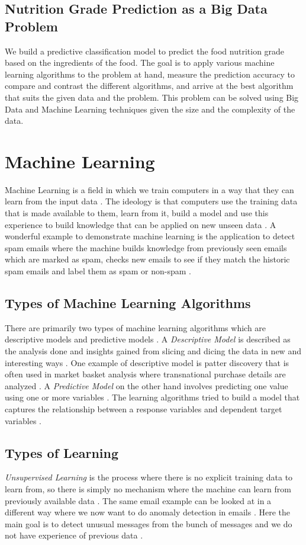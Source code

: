 \documentclass[sigconf]{acmart}
\begin{document}
\subsection{Nutrition Grade Prediction as a Big Data Problem}
We build a predictive classification model to predict the food nutrition grade based on the ingredients of the food. The goal is to apply various machine learning algorithms to the problem at hand, measure the prediction accuracy to compare and contrast the different algorithms, and arrive at the best algorithm that suits the given data and the problem. This problem can be solved using Big Data and Machine Learning techniques given the size and the complexity of the data.

\section{Machine Learning}
Machine Learning is a field in which we train computers in a way that they can learn from the input data \cite{book-shai}. The ideology is that computers use the training data that is made available to them, learn from it, build a model and use this experience to build knowledge that can be applied on new unseen data \cite{book-shai}. A wonderful example to demonstrate machine learning is the application to detect spam emails where the machine builds knowledge from previously seen emails which are marked as spam, checks new emails to see if they match the historic spam emails and label them as spam or non-spam \cite{book-shai}. 

\subsection{Types of Machine Learning Algorithms}
There are primarily two types of machine learning algorithms which are descriptive models and predictive models \cite{book-shai}. A {\em Descriptive Model} is described as the analysis done and insights gained from slicing and dicing the data in new and interesting ways \cite{book-shai}. One example of descriptive model is patter discovery that is often used in market basket analysis where transnational purchase details are analyzed \cite{book-shai}. A {\em Predictive Model} on the other hand involves predicting one value using one or more variables \cite{book-shai}. The learning algorithms tried to build a model that captures the relationship between a response variables and dependent target variables \cite{book-tan}.

\subsection{Types of Learning}
{\em Unsupervised Learning} is the process where there is no explicit training data to learn from, so there is simply no mechanism where the machine can learn from previously available data \cite{book-shai}. The same email example can be looked at in a different way where we now want to do anomaly detection in emails \cite{book-shai}. Here the main goal is to detect unusual messages from the bunch of messages and we do not have experience of previous data \cite{book-shai}. \\
\end{document}
